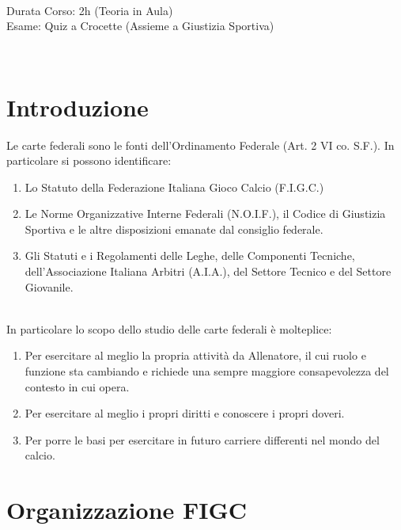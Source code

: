 \documentclass[../uefaC.tex]{subfiles}
\begin{document}

\hfill \\
Durata Corso: 2h (Teoria in Aula) \hfill \\
Esame: Quiz a Crocette (Assieme a Giustizia Sportiva)

\hfill \\
\section{Introduzione}
Le carte federali sono le fonti dell'Ordinamento Federale (Art. 2 VI co. S.F.). In particolare si possono identificare:
\begin{enumerate}
    \item Lo Statuto della Federazione Italiana Gioco Calcio (F.I.G.C.)
    \item Le Norme Organizzative Interne Federali (N.O.I.F.), il Codice di Giustizia Sportiva e le altre disposizioni emanate dal consiglio federale.
    \item Gli Statuti e i Regolamenti delle Leghe, delle Componenti Tecniche, dell'Associazione Italiana Arbitri (A.I.A.), del Settore Tecnico e del Settore Giovanile.
\end{enumerate}
\hfill \\
In particolare lo scopo dello studio delle carte federali è molteplice:
\begin{enumerate}
    \item Per esercitare al meglio la propria attività da Allenatore, il cui ruolo e funzione sta cambiando e richiede una sempre maggiore consapevolezza del contesto in cui opera.
    \item Per esercitare al meglio i propri diritti e conoscere i propri doveri.
    \item Per porre le basi per esercitare in futuro carriere differenti nel mondo del calcio.
\end{enumerate}

\section{Organizzazione FIGC}
\end{document}
